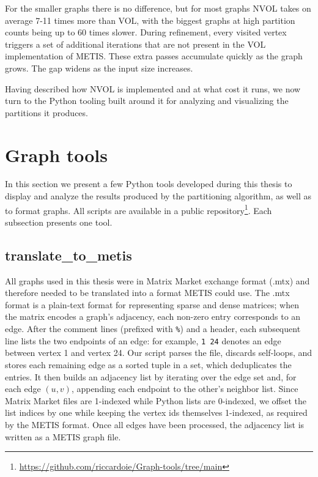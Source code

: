 For the smaller graphs there is no difference, but for most graphs NVOL takes on average 7-11 times more than VOL, with the biggest graphs at high partition counts being up to 60 times slower. During refinement, every visited vertex triggers a set of additional iterations that are not present in the VOL implementation of METIS. These extra passes accumulate quickly as the graph grows. The gap widens as the input size increases.

Having described how NVOL is implemented and at what cost it runs, we now turn to the Python tooling built around it for analyzing and visualizing the partitions it produces.

\section{Graph tools} \label{sec:graph tools}
In this section we present a few Python tools developed during this thesis to display and analyze the results produced by the partitioning algorithm, as well as to format graphs. All scripts are available in a public repository\footnote{\url{https://github.com/riccardoie/Graph-tools/tree/main}}. Each subsection presents one tool.

\subsection{translate\_to\_metis}
All graphs used in this thesis were in Matrix Market exchange format (.mtx) and therefore needed to be translated into a format METIS could use. The .mtx format is a plain-text format for representing sparse and dense matrices; when the matrix encodes a graph's adjacency, each non-zero entry corresponds to an edge. After the comment lines (prefixed with \texttt{\%}) and a header, each subsequent line lists the two endpoints of an edge: for example, \texttt{1 24} denotes an edge between vertex 1 and vertex 24. Our script parses the file, discards self-loops, and stores each remaining edge as a sorted tuple in a set, which deduplicates the entries. It then builds an adjacency list by iterating over the edge set and, for each edge $(u, v)$, appending each endpoint to the other's neighbor list. Since Matrix Market files are 1-indexed while Python lists are 0-indexed, we offset the list indices by one while keeping the vertex ids themselves 1-indexed, as required by the METIS format. Once all edges have been processed, the adjacency list is written as a METIS graph file.

